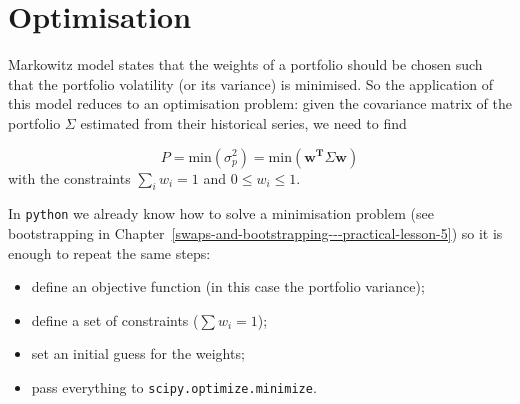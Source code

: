 \section{Optimisation}\label{optimization}

Markowitz model states that the weights of a portfolio should be chosen 
such that the portfolio volatility (or its variance) is minimised. 
So the application of this model reduces to
an optimisation problem: given the covariance matrix of the portfolio
$\Sigma$ estimated from their historical series, we need to find

\[ P = \textrm{min}(\sigma_p^2) = \textrm{min}(\mathbf{w^T}\Sigma\mathbf{w})\]
with the constraints \(\sum_{i}w_i = 1\) and \(0 \le w_i \le 1\).

In \texttt{python} we already know how to solve a minimisation problem
(see bootstrapping in Chapter~\ref{swaps-and-bootstrapping---practical-lesson-5}) 
so it is enough to repeat the same steps:

\begin{itemize}
\tightlist
\item
  define an objective function (in this case the portfolio variance);
\item
  define a set of constraints ($\sum w_i = 1$);
\item
  set an initial guess for the weights;
\item
  pass everything to \texttt{scipy.optimize.minimize}.
\end{itemize}


